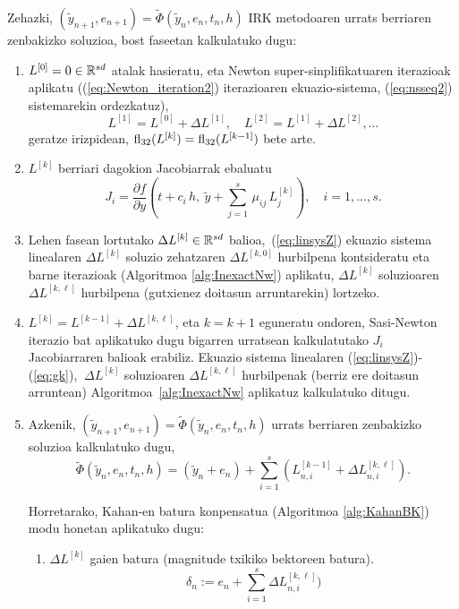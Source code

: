Zehazki, $(\tilde{y}_{n+1}, e_{n+1})=\tilde \Phi(\tilde{y}_n, e_n, t_n, h)$  IRK metodoaren urrats berriaren zenbakizko soluzioa, bost faseetan kalkulatuko dugu:
 \begin{enumerate}
\item
$L^{[0]}=0 \in \mathbb{R}^{sd}$ atalak hasieratu, eta Newton super-sinplifikatuaren iterazioak aplikatu ((\ref{eq:Newton_iteration2}) iterazioaren ekuazio-sistema, (\ref{eq:nsseq2}) sistemarekin ordezkatuz), 
\[
L^{[1]}=L^{[0]} +\Delta L^{[1]}, \quad  L^{[2]}=L^{[1]} +\Delta L^{[2]} , \ldots
\]
geratze irizpidean, $ \mathrm{fl}_{32}(L^{[k]}) = \mathrm{fl}_{32}(L^{[k-1]})$ bete arte.

\item
$L^{[k]}$ berriari dagokion Jacobiarrak ebaluatu 
\begin{equation*}
J_i= \frac{\partial f}{\partial y}\left(t +c_i\,  h,  \ \tilde y+  \sum_{j=1}^{s}\, \mu_{ij}\, L_{j}^{[k]}\right), \quad i=1,\ldots,s.
\end{equation*}
%
\item
Lehen fasean lortutako $\Delta L^{[k]} \in \mathbb{R}^{sd}$ balioa,~(\ref{eq:linsysZ}) ekuazio sistema linealaren $\Delta L^{[k]}$ soluzio zehatzaren $\Delta L^{[k,0]}$ hurbilpena kontsideratu eta 
barne iterazioak  (Algoritmoa \ref{alg:InexactNw}) aplikatu, $\Delta L^{[k]}$ soluzioaren $\Delta L^{[k,\ell]}$ hurbilpena (gutxienez doitasun arruntarekin) lortzeko.

\item 
$L^{[k]} = L^{[k-1]} + \Delta L^{[k,\ell]}$, eta $k=k+1$ eguneratu ondoren, Sasi-Newton iterazio bat aplikatuko dugu bigarren urratsean kalkulatutako $J_i$ Jacobiarraren balioak erabiliz. Ekuazio sistema linealaren (\ref{eq:linsysZ})-(\ref{eq:gk}), $ \ \Delta L^{[k]}$ soluzioaren  $\Delta L^{[k,\ell]}$ hurbilpenak (berriz ere doitasun arruntean)  Algoritmoa~\ref{alg:InexactNw} aplikatuz kalkulatuko ditugu.

\item 
Azkenik, $(\tilde{y}_{n+1}, e_{n+1})=\tilde \Phi(\tilde{y}_n, e_n, t_n, h)$  urrats berriaren zenbakizko soluzioa kalkulatuko dugu,
\begin{equation*}
\tilde \Phi(\tilde{y}_n, e_n, t_n, h)=(\tilde y_n + e_n) + \sum_{i=1}^{s}(L_{n,i}^{[k-1]} + \Delta L_{n,i}^{[k,\ell]}).
\end{equation*}

Horretarako, Kahan-en batura konpensatua (Algoritmoa \ref{alg:KahanBK}) modu honetan aplikatuko dugu:
\begin{enumerate}
\item $\Delta L^{[k]}$ gaien batura (magnitude txikiko bektoreen batura).
\begin{equation*}
\delta_n :=  e_n + \sum_{i=1}^{s} \Delta L_{n,i}^{[k,\ell]})
\end{equation*}


\end{enumerate}
\end{enumerate}
